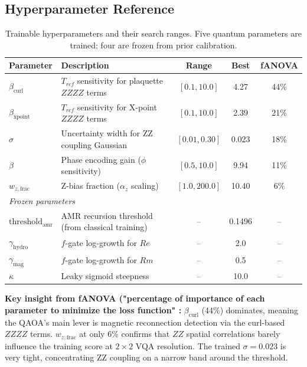 \documentclass[12pt, a4paper, oneside]{report}
\begin{document}
\subsection{Hyperparameter Reference}

\begin{table}[H]
\centering
\caption{Trainable hyperparameters and their search ranges. Five quantum parameters are trained; four are frozen from prior calibration.}
\label{tab:hyperparams}
\begin{tabular}{llccc}
\toprule
\textbf{Parameter} & \textbf{Description} & \textbf{Range} & \textbf{Best} & \textbf{fANOVA} \\
\midrule
$\beta_{\text{curl}}$    & $T_{rcf}$ sensitivity for plaquette $ZZZZ$ terms & $[0.1, 10.0]$  & 4.27 & 44\% \\
$\beta_{\text{xpoint}}$  & $T_{rcf}$ sensitivity for X-point $ZZZZ$ terms   & $[0.1, 10.0]$  & 2.39 & 21\% \\
$\sigma$                 & Uncertainty width for ZZ coupling Gaussian        & $[0.01, 0.30]$ & 0.023 & 18\% \\
$\beta$                  & Phase encoding gain ($\phi$ sensitivity)           & $[0.5, 10.0]$  & 9.94 & 11\% \\
$w_{z,\text{frac}}$      & Z-bias fraction ($\alpha_z$ scaling)               & $[1.0, 200.0]$ & 10.40 & 6\% \\
\midrule
\multicolumn{5}{l}{\textit{Frozen parameters}} \\
$\text{threshold}_{\text{amr}}$ & AMR recursion threshold (from classical training) & -- & 0.1496 & -- \\
$\gamma_{\text{hydro}}$  & $f$-gate log-growth for $Re$                      & -- & 2.0 & -- \\
$\gamma_{\text{mag}}$    & $f$-gate log-growth for $Rm$                      & -- & 0.5 & -- \\
$\kappa$                 & Leaky sigmoid steepness                            & -- & 10.0 & -- \\
\bottomrule
\end{tabular}
\end{table}

\textbf{Key insight from fANOVA ("percentage of importance of each parameter to minimize the loss function" :} $\beta_{\text{curl}}$ (44\%) dominates, meaning the QAOA's main lever is magnetic reconnection detection via the curl-based $ZZZZ$ terms. $w_{z,\text{frac}}$ at only 6\% confirms that $ZZ$ spatial correlations barely influence the training score at $2\times 2$ VQA resolution. The trained $\sigma = 0.023$ is very tight, concentrating ZZ coupling on a narrow band around the threshold.
\end{document}

